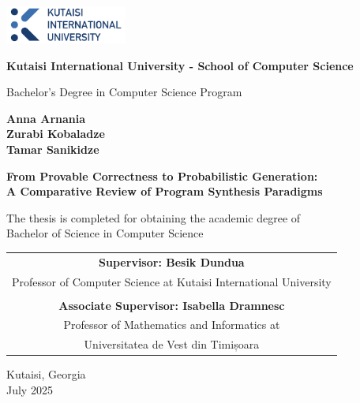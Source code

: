 \documentclass[12pt, a4paper]{report}
\begin{document}
\begin{titlepage}
    \centering
    
    \includegraphics[width=4cm]{logo.png} 
    
    \vspace{1.5cm}
    
    {\large\bfseries Kutaisi International University - School of Computer Science}
    
    \vspace{0.5cm}
    
    {Bachelor's Degree in Computer Science Program}
    
    \vfill
    
    {\large\bfseries Anna Arnania} \\
    \vspace{0.1cm}
    {\large\bfseries Zurabi Kobaladze} \\
    \vspace{0.1cm}
    {\large\bfseries Tamar Sanikidze}
    
    \vfill
    
    {\bfseries\large From Provable Correctness to Probabilistic Generation: \\[0.5em] A Comparative Review of Program Synthesis Paradigms}
    
    \vfill
    
    {The thesis is completed for obtaining the academic degree of \\ Bachelor of Science in Computer Science}

    \vspace{0.8cm}
    
    \begin{tabular}{c}
        \bfseries Supervisor: Besik Dundua \\
        Professor of Computer Science at Kutaisi International University \\
        \vspace{0.01cm} \\
        \bfseries Associate Supervisor: Isabella Dramnesc \\
         Professor of Mathematics and Informatics at \\ Universitatea de Vest din Timișoara
    \end{tabular}
    
    \vfill
    
    {\large Kutaisi, Georgia} \\
    {\large July 2025}
    
\end{titlepage}
\end{document}
